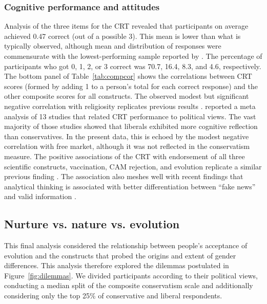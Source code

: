\documentclass[fignum,man]{apa}\usepackage[]{graphicx}\usepackage[]{color}
\begin{document}
\subsubsection{Cognitive performance and attitudes}
Analysis of the three items for the CRT revealed that participants on average
achieved 0.47 correct (out of a possible 3).
This mean is lower than what is typically observed, although
mean and distribution of responses were commensurate with the lowest-performing
sample reported by .
The percentage of participants who got 0, 1, 2, or 3 correct was 
70.7, 16.4, 8.3,
and 4.6, respectively. 
The bottom panel of Table~\ref{tab:compcor} shows the
correlations between CRT scores (formed by adding 1 
to a person's total for each correct response) 
and the other composite scores for all constructs.
The observed modest but significant negative correlation with
religiosity replicates previous results \cite{Gervais12a,Shenhav12,Stagnaro19}. 
 reported a 
meta analysis of 13 studies that related CRT performance to political views.
The vast majority of those studies showed
that liberals exhibited more cognitive reflection than conservatives.
In the present data, this is echoed by the modest negative
correlation with free market, although it was not reflected in the
conservatism measure. 
The positive associations of the CRT with endorsement of all three
scientific constructs, vaccination, CAM rejection, and evolution
replicate a similar previous finding \cite{WagnerEgger18}.
The association also meshes well with recent findings that analytical thinking
is associated with better differentiation between ``fake news'' and
valid information \cite{Pennycook18}.  


\subsection{Nurture vs. nature vs. evolution}
This final analysis considered the relationship between people's
acceptance of evolution and the 
constructs that probed the origins and extent of gender differences. 
This analysis therefore explored the dilemmas postulated in 
Figure~\ref{fig:dilemmas}.
We divided participants according to their political views,
conducting a median split of the composite conservatism scale and additionally
considering only the top 25\% of conservative and liberal respondents.
\end{document}
